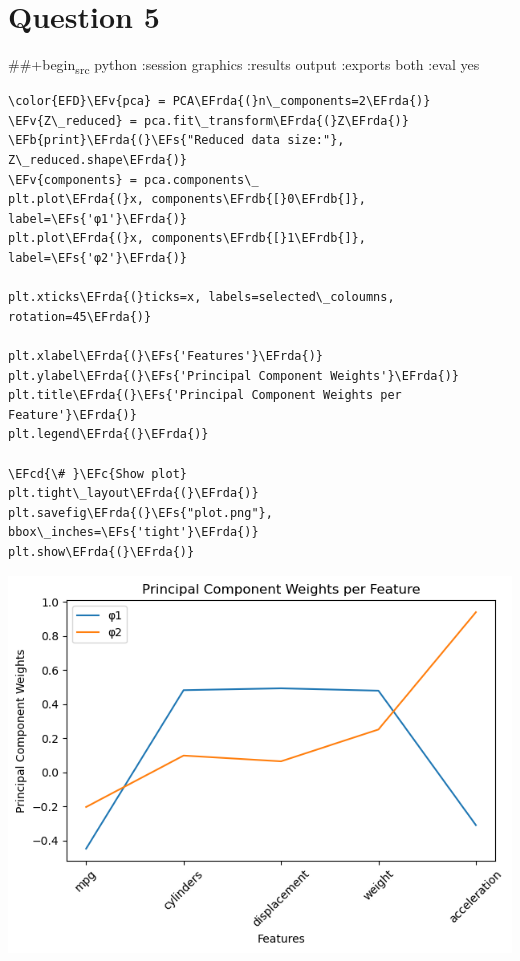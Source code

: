 \documentclass[11pt]{article}
\newcommand{\EFc}[1]{\textcolor{EFc}{#1}} %
\newcommand{\EFcd}[1]{\textcolor{EFcd}{#1}} %
\newcommand{\EFs}[1]{\textcolor{EFs}{#1}} %
\newcommand{\EFb}[1]{\textcolor{EFb}{#1}} %
\newcommand{\EFv}[1]{\textcolor{EFv}{#1}} %
\newcommand{\EFrda}[1]{\textcolor{EFrda}{#1}} %
\newcommand{\EFrdb}[1]{\textcolor{EFrdb}{#1}} %
\begin{document}
\section*{Question 5}
\label{sec:org3033500}

\#\#+begin\textsubscript{src} python :session graphics :results output :exports both :eval yes
\begin{Code}
\begin{Verbatim}
\color{EFD}\EFv{pca} = PCA\EFrda{(}n\_components=2\EFrda{)}
\EFv{Z\_reduced} = pca.fit\_transform\EFrda{(}Z\EFrda{)}
\EFb{print}\EFrda{(}\EFs{"Reduced data size:"}, Z\_reduced.shape\EFrda{)}
\EFv{components} = pca.components\_
plt.plot\EFrda{(}x, components\EFrdb{[}0\EFrdb{]}, label=\EFs{'φ1'}\EFrda{)}
plt.plot\EFrda{(}x, components\EFrdb{[}1\EFrdb{]}, label=\EFs{'φ2'}\EFrda{)}

plt.xticks\EFrda{(}ticks=x, labels=selected\_coloumns, rotation=45\EFrda{)}

plt.xlabel\EFrda{(}\EFs{'Features'}\EFrda{)}
plt.ylabel\EFrda{(}\EFs{'Principal Component Weights'}\EFrda{)}
plt.title\EFrda{(}\EFs{'Principal Component Weights per Feature'}\EFrda{)}
plt.legend\EFrda{(}\EFrda{)}

\EFcd{\# }\EFc{Show plot}
plt.tight\_layout\EFrda{(}\EFrda{)}
plt.savefig\EFrda{(}\EFs{"plot.png"}, bbox\_inches=\EFs{'tight'}\EFrda{)}
plt.show\EFrda{(}\EFrda{)}
\end{Verbatim}
\end{Code}

\begin{center}
\includegraphics[width=.9\linewidth]{plot.png}
\end{center}
\end{document}
